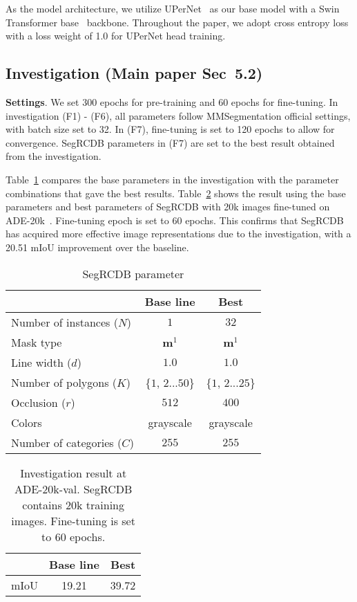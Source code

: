 \documentclass[10pt,twocolumn,letterpaper]{article}
\begin{document}
As the model architecture, we utilize UPerNet~\cite{xiao2018unified} as our base model with a Swin Transformer base~\cite{liu2021Swin} backbone. Throughout the paper, we adopt cross entropy loss with a loss weight of 1.0 for UPerNet head training.


\subsection{Investigation (Main paper Sec~5.2)}
\textbf{Settings}.
We set 300 epochs for pre-training and 60 epochs for fine-tuning.  In investigation (F1) - (F6), all parameters follow MMSegmentation official settings, with batch size set to 32. 
In (F7), fine-tuning is set to 120 epochs to allow for convergence. 
SegRCDB parameters in (F7) are set to the best result obtained from the investigation.

Table~\ref{SegRCDB_param} compares the base parameters in the investigation with the parameter combinations that gave the best results. 
Table~\ref{investigation_result} shows the result using the base parameters and best parameters of SegRCDB with 20k images fine-tuned on ADE-20k~\cite{zhou2017scene}. Fine-tuning epoch is set to 60 epochs. 
This confirms that SegRCDB has acquired more effective image representations due to the investigation, with a 20.51 mIoU improvement over the baseline.
\begin{table}
  \centering
  \caption{SegRCDB parameter}
  \begin{tabular}{lcc}
    \toprule
     &Base line &Best\\
    \midrule
       Number of instances ($N$) & $1$& $32$ \\
       Mask type & $\bm{m}^{1}$ & $\bm{m}^{1}$ \\
       Line width ($d$)& $1.0$  & $1.0$ \\
       Number of polygons ($K$)& \{$1$, $2$...$50$\}  & \{$1$, $2$...$25$\}\\
        Occlusion ($r$) & $512$ & $400$\\
      Colors & grayscale& grayscale\\
      Number of categories ($C$) & $255$ & $255$ \\
    \bottomrule
  \end{tabular}
  \label{SegRCDB_param}
  \vspace{-10pt}
\end{table}
\setlength\floatsep{20pt}
\begin{table}[t]
\begin{center}
    \caption{Investigation result at ADE-20k-val. SegRCDB contains 20k training images. Fine-tuning is set to 60 epochs. } 
    \begin{tabular}{lcc}
      \toprule
      & Base line& Best \\
       \midrule
        mIoU& 19.21 & 39.72\\
    \bottomrule
 \end{tabular}
\label{investigation_result}
\end{center}
\vspace{-10pt}
\end{table}
\end{document}
